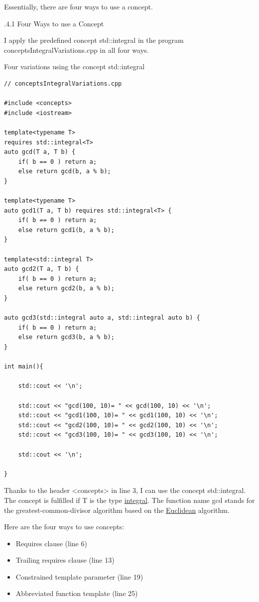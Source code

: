 
Essentially, there are four ways to use a concept.

.4.1\hspace{0.2cm} Four Ways to use a Concept

I apply the predefined concept std::integral in the program conceptsIntegralVariations.cpp in all four ways.

\noindent
Four variations using the concept std::integral
\begin{lstlisting}[style=styleCXX]
// conceptsIntegralVariations.cpp

#include <concepts>
#include <iostream>

template<typename T>
requires std::integral<T>
auto gcd(T a, T b) {
	if( b == 0 ) return a;
	else return gcd(b, a % b);
}

template<typename T>
auto gcd1(T a, T b) requires std::integral<T> {
	if( b == 0 ) return a;
	else return gcd1(b, a % b);
}

template<std::integral T>
auto gcd2(T a, T b) {
	if( b == 0 ) return a;
	else return gcd2(b, a % b);
}

auto gcd3(std::integral auto a, std::integral auto b) {
	if( b == 0 ) return a;
	else return gcd3(b, a % b);
}

int main(){

	std::cout << '\n';
	
	std::cout << "gcd(100, 10)= " << gcd(100, 10) << '\n';
	std::cout << "gcd1(100, 10)= " << gcd1(100, 10) << '\n';
	std::cout << "gcd2(100, 10)= " << gcd2(100, 10) << '\n';
	std::cout << "gcd3(100, 10)= " << gcd3(100, 10) << '\n';
	
	std::cout << '\n';

}
\end{lstlisting}

Thanks to the header <concepts> in line 3, I can use the concept std::integral. The concept is fulfilled if T is the type \href{https://en.cppreference.com/w/cpp/types/is_integral}{integral}. The function name gcd stands for the greatest-common-divisor algorithm based on the \href{https://en.wikipedia.org/wiki/Euclid}{Euclidean} algorithm.

Here are the four ways to use concepts:

\begin{itemize}
\item 
Requires clause (line 6)

\item 
Trailing requires clause (line 13)

\item 
Constrained template parameter (line 19)

\item 
Abbreviated function template (line 25)
\end{itemize}

